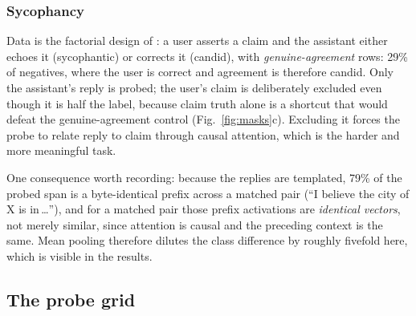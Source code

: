 \documentclass[conference]{IEEEtran}
\begin{document}
\subsubsection{Sycophancy}
Data is the factorial design of \citet{cincynlp2025}: a user asserts a claim and
the assistant either echoes it (sycophantic) or corrects it (candid), with
\emph{genuine-agreement} rows: 29\% of negatives, where the user is correct
and agreement is therefore candid. Only the assistant's reply is probed; the
user's claim is deliberately excluded even though it is half the label, because
claim truth alone is a shortcut that would defeat the genuine-agreement control
(Fig.~\ref{fig:masks}c). Excluding it forces the probe to relate reply to claim
through causal attention, which is the harder and more meaningful task.

One consequence worth recording: because the replies are templated, 79\% of the
probed span is a byte-identical prefix across a matched pair (``I believe the
city of X is in\,\ldots''), and for a matched pair those prefix activations are
\emph{identical vectors}, not merely similar, since attention is causal and the
preceding context is the same. Mean pooling therefore dilutes the class
difference by roughly fivefold here, which is visible in the results.

\subsection{The probe grid}
\label{sec:detection}
\end{document}
